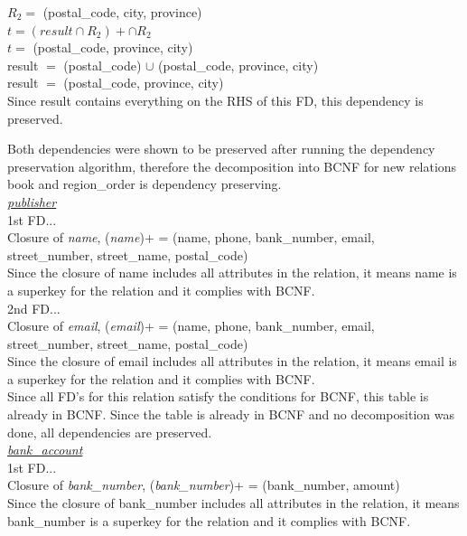 \documentclass[a4 paper]{article}
\begin{document}
\begin{enumerate}
	$R_{2} =$ (postal\_code, city, province)\\
	$t = (result \cap R_{2})+ \cap R_{2}$\\
	$t =$ (postal\_code, province, city)\\
	result $=$ (postal\_code) $\cup$ (postal\_code, province, city)\\
	result $=$ (postal\_code, province, city)\\
	
	Since result contains everything on the RHS of this FD, this dependency is preserved.

\end{enumerate}

\noindent Both dependencies were shown to be preserved after running the dependency preservation algorithm, therefore the decomposition into BCNF for new relations book and region\_order is dependency preserving.\\

\noindent\underline{\emph{publisher}}\\

\noindent 1st FD...\\
\indent Closure of \emph{name}, (\emph{name})+ = (name, phone, bank\_number, email, street\_number, street\_name, postal\_code)\\
\indent Since the closure of name includes all attributes in the relation, it means name is a superkey for the relation and it complies with BCNF.\\

\noindent 2nd FD...\\
\indent Closure of \emph{email}, (\emph{email})+ = (name, phone, bank\_number, email, street\_number, street\_name, postal\_code)\\
\indent Since the closure of email includes all attributes in the relation, it means email is a superkey for the relation and it complies with BCNF.\\

\noindent Since all FD's for this relation satisfy the conditions for BCNF, this table is already in BCNF. Since the table is already in BCNF and no decomposition was done, all dependencies are preserved.\\

\noindent\underline{\emph{bank\_account}}\\

\noindent 1st FD...\\
\indent Closure of \emph{bank\_number}, (\emph{bank\_number})+ = (bank\_number, amount)\\
\indent Since the closure of bank\_number includes all attributes in the relation, it means bank\_number is a superkey for the relation and it complies with BCNF.\\
\end{document}
